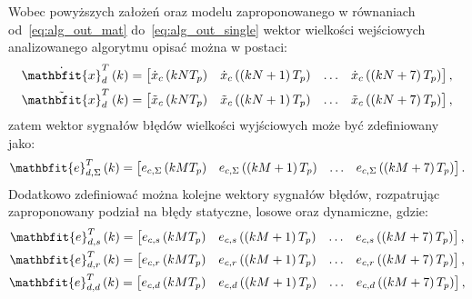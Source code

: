 Wobec powyższych założeń oraz modelu zaproponowanego w równaniach od~\eqref{eq:alg_out_mat} do~\eqref{eq:alg_out_single} wektor wielkości wejściowych analizowanego algorytmu opisać można w postaci:
\begin{gather}
\dot{\mathbfit{x}}_{d}^{T} \emb{k} =
\begin{bmatrix}
\dot{x}_{c} \emb{kNT_{p}} & \dot{x}_{c} \left( \emb{kN+1} T_{p} \right) & \hdots & \dot{x}_{c} \left( \emb{kN+7} T_{p} \right)
\end{bmatrix}
\label{eq:sym_partd_input_ideal}, \\
\tilde{\mathbfit{x}}_{d}^{T} \emb{k} =
\begin{bmatrix}
\tilde{x}_{c} \emb{kNT_{p}} & \tilde{x}_{c} \left( \emb{kN+1} T_{p} \right) & \hdots & \tilde{x}_{c} \left( \emb{kN+7} T_{p} \right)
\end{bmatrix}
\label{eq:sym_partd_input_real},
\end{gather}
zatem wektor sygnałów błędów wielkości wyjściowych może być zdefiniowany jako:
\begin{equation}
\mathbfit{e}_{d,\Sigma}^{T} \emb{k} =
\begin{bmatrix}
e_{c,\Sigma} \emb{kMT_{p}} & e_{c,\Sigma} \left( \emb{kM+1} T_{p} \right) & \hdots & e_{c,\Sigma} \left( \emb{kM+7} T_{p} \right)
\end{bmatrix}
\label{eq:sym_partd_input_error_sum}.
\end{equation}
Dodatkowo zdefiniować można kolejne wektory sygnałów błędów, rozpatrując zaproponowany podział na błędy statyczne, losowe oraz dynamiczne, gdzie:
\begin{gather}
\mathbfit{e}_{d,s}^{T} \emb{k} =
\begin{bmatrix}
e_{c,s} \emb{kMT_{p}} & e_{c,s} \left( \emb{kM+1} T_{p} \right) & \hdots & e_{c,s} \left( \emb{kM+7} T_{p} \right)
\end{bmatrix}
\label{eq:sym_partd_input_error_stat}, \\
\mathbfit{e}_{d,r}^{T} \emb{k} =
\begin{bmatrix}
e_{c,r} \emb{kMT_{p}} & e_{c,r} \left( \emb{kM+1} T_{p} \right) & \hdots & e_{c,r} \left( \emb{kM+7} T_{p} \right)
\end{bmatrix}
\label{eq:sym_partd_input_error_rand}, \\
\mathbfit{e}_{d,d}^{T} \emb{k} =
\begin{bmatrix}
e_{c,d} \emb{kMT_{p}} & e_{c,d} \left( \emb{kM+1} T_{p} \right) & \hdots & e_{c,d} \left( \emb{kM+7} T_{p} \right)
\end{bmatrix}
\label{eq:sym_partd_input_error_dyn},
\end{gather}
